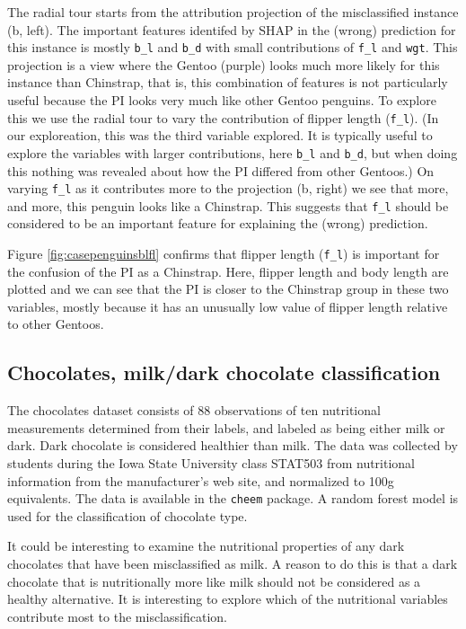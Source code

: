 \documentclass[
]{article}
\begin{document}
The radial tour starts from the attribution projection of the misclassified instance (b, left). The important features identifed by SHAP in the (wrong) prediction for this instance is mostly \texttt{b\_l} and \texttt{b\_d} with small contributions of \texttt{f\_l} and \texttt{wgt}. This projection is a view where the Gentoo (purple) looks much more likely for this instance than Chinstrap, that is, this combination of features is not particularly useful because the PI looks very much like other Gentoo penguins. To explore this we use the radial tour to vary the contribution of flipper length (\texttt{f\_l}). (In our exploreation, this was the third variable explored. It is typically useful to explore the variables with larger contributions, here \texttt{b\_l} and \texttt{b\_d}, but when doing this nothing was revealed about how the PI differed from other Gentoos.) On varying \texttt{f\_l} as it contributes more to the projection (b, right) we see that more, and more, this penguin looks like a Chinstrap. This suggests that \texttt{f\_l} should be considered to be an important feature for explaining the (wrong) prediction.

Figure \ref{fig:casepenguinsblfl} confirms that flipper length (\texttt{f\_l}) is important for the confusion of the PI as a Chinstrap. Here, flipper length and body length are plotted and we can see that the PI is closer to the Chinstrap group in these two variables, mostly because it has an unusually low value of flipper length relative to other Gentoos.

\hypertarget{chocolates-milkdark-chocolate-classification}{%
\subsection{Chocolates, milk/dark chocolate classification}\label{chocolates-milkdark-chocolate-classification}}

The chocolates dataset consists of 88 observations of ten nutritional measurements determined from their labels, and labeled as being either milk or dark. Dark chocolate is considered healthier than milk. The data was collected by students during the Iowa State University class STAT503 from nutritional information from the manufacturer's web site, and normalized to 100g equivalents. The data is available in the \texttt{cheem} package. A random forest model is used for the classification of chocolate type.

It could be interesting to examine the nutritional properties of any dark chocolates that have been misclassified as milk. A reason to do this is that a dark chocolate that is nutritionally more like milk should not be considered as a healthy alternative. It is interesting to explore which of the nutritional variables contribute most to the misclassification.
\end{document}
